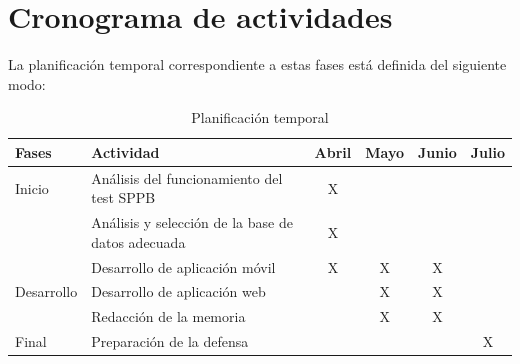 \documentclass[12pt,oneside,a4paper]{article}
\begin{document}
\newpage

\section{Cronograma de actividades}
\hline

La planificación temporal correspondiente a estas fases está definida del siguiente modo: 
\begin{table}[H]
\begin{tabular}{|l|l|c|c|c|c|}
\hline
\rowcolor[HTML]{DAE8FC} 
Fases                        & Actividad                                         & \multicolumn{1}{l|}{\cellcolor[HTML]{DAE8FC}Abril} & \multicolumn{1}{l|}{\cellcolor[HTML]{DAE8FC}Mayo} & \multicolumn{1}{l|}{\cellcolor[HTML]{DAE8FC}Junio} & \multicolumn{1}{l|}{\cellcolor[HTML]{DAE8FC}Julio} \\ \hline
Inicio                       & Análisis del funcionamiento del test SPPB         & X                                                  &                                                   &                                                    &                                                    \\ \hline
                             & Análisis y selección de la base de datos adecuada & X                                                  &                                                   &                                                    &                                                    \\ \cline{2-6} 
                             & Desarrollo de aplicación móvil                    & X                                                  & X                                                 & X                                                  &                                                    \\ \cline{2-6} 
\multirow{-3}{*}{Desarrollo} & Desarrollo de aplicación web                      &                                                    & X                                                 & X                                                  &                                                    \\ \hline
                             & Redacción de la memoria                           &                                                    & X                                                 & X                                                  &                                                    \\ \cline{2-6} 
\multirow{-2}{*}{Final}      & Preparación de la defensa                         &                                                    &                                                   &                                                    & X                                                  \\ \hline
\end{tabular}
\caption{Planificación temporal}
\end{table}
\end{document}
